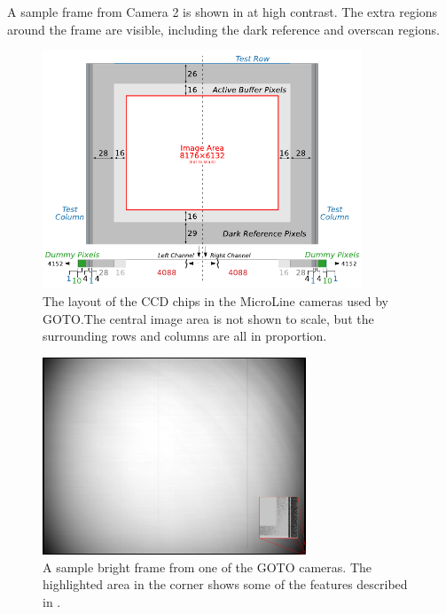 \begin{colsection}
\begin{colsection}
A sample frame from Camera 2 is shown in  at high contrast. The extra regions around the frame are visible, including the dark reference and overscan regions.

\begin{figure}[p]
    \begin{center}
        \includegraphics[width=0.85\textwidth]{images/chip}
    \end{center}
    \caption[The layout of the CCD chips in the MicroLine cameras used by GOTO]{
        The layout of the CCD chips in the MicroLine cameras used by GOTO.\@ The central image area is not shown to scale, but the surrounding rows and columns are all in proportion.
        }\label{fig:chip}
\end{figure}

\begin{figure}[p]
    \begin{center}
        \includegraphics[width=0.7\textwidth]{images/sample.png}
    \end{center}
    \caption[]{
        A sample bright frame from one of the GOTO cameras. The highlighted area in the corner shows some of the features described in .
        }\label{fig:frame}
\end{figure}


\end{colsection}
\end{colsection}
